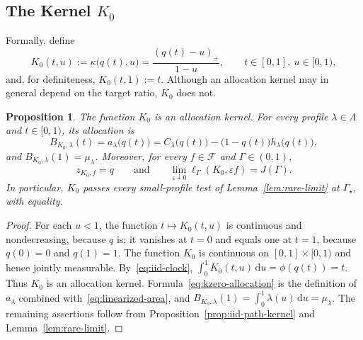 \documentclass[11pt]{article}
\newtheorem{proposition}[theorem]{Proposition}
\theoremstyle{definition}
\theoremstyle{remark}
\newcommand{\dd}{\,\mathrm d}
\begin{document}
\subsection{The Kernel \texorpdfstring{$K_0$}{K0}}\label{sec:kzero-definition}

Formally, define
\begin{equation}\label{eq:kzero-uniform}
 K_0(t,u):=\kappa\bigl(q(t),u\bigr)=\frac{(q(t)-u)_+}{1-u},
 \qquad t\in[0,1],\ u\in[0,1),
\end{equation}
and, for definiteness, $K_0(t,1):=t$.
Although an allocation kernel may in general depend on the target ratio, $K_0$ does not.

\begin{proposition}\label{prop:kzero-kernel}
The function $K_0$ is an allocation kernel.
For every profile $\lambda\in\Lambda$ and $t\in[0,1)$, its allocation is
\begin{equation}\label{eq:kzero-allocation}
 B_{K_0,\lambda}(t)
 =a_\lambda\bigl(q(t)\bigr)
 =C_\lambda\bigl(q(t)\bigr)-\bigl(1-q(t)\bigr)h_\lambda\bigl(q(t)\bigr),
\end{equation}
and $B_{K_0,\lambda}(1)=\mu_\lambda$.
Moreover, for every $f\in\mathcal F$ and $\Gamma\in(0,1)$,
\[
 z_{K_0,f}=q
 \qquad\text{and}\qquad
 \lim_{\varepsilon\downarrow0}\ell_\Gamma(K_0,\varepsilon f)=J(\Gamma).
\]
In particular, $K_0$ passes every small-profile test of Lemma~\ref{lem:rare-limit} at $\Gamma_\star$, with equality.
\end{proposition}

\begin{proof}
For each $u<1$, the function $t\mapsto K_0(t,u)$ is continuous and nondecreasing, because $q$ is; it vanishes at $t=0$ and equals one at $t=1$, because $q(0)=0$ and $q(1)=1$.
The function $K_0$ is continuous on $[0,1]\times[0,1)$ and hence jointly measurable.
By~\eqref{eq:iid-clock}, $\int_0^1K_0(t,u)\dd u=\phi(q(t))=t$.
Thus $K_0$ is an allocation kernel.
Formula~\eqref{eq:kzero-allocation} is the definition of $a_\lambda$ combined with~\eqref{eq:linearized-area}, and $B_{K_0,\lambda}(1)=\int_0^1\lambda(u)\dd u=\mu_\lambda$.
The remaining assertions follow from Proposition~\ref{prop:iid-path-kernel} and Lemma~\ref{lem:rare-limit}.
\end{proof}
\end{document}
